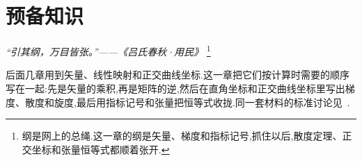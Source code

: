 \chapter{预备知识}
\label{ch:prelim}

\begin{flushright}
\textit{“引其纲，万目皆张。”——《吕氏春秋·用民》}
\footnote{纲是网上的总绳.这一章的纲是矢量、梯度和指标记号,抓住以后,散度定理、正交坐标和张量恒等式都顺着张开.}
\end{flushright}

后面几章用到矢量、线性映射和正交曲线坐标.这一章把它们按计算时需要的顺序写在一起:先是矢量的乘积,再是矩阵的逆,然后在直角坐标和正交曲线坐标里写出梯度、散度和旋度,最后用指标记号和张量把恒等式收拢.同一套材料的标准讨论见~\cite{arfken,byron,riley}.







